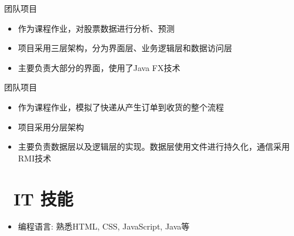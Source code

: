 \documentclass{resume}
\begin{document}
  {团队项目}
\begin{onehalfspacing}
\begin{itemize}
  \item 作为课程作业，对股票数据进行分析、预测
  \item 项目采用三层架构，分为界面层、业务逻辑层和数据访问层
  \item 主要负责大部分的界面，使用了Java FX技术
\end{itemize}
\end{onehalfspacing}

  {团队项目}
\begin{onehalfspacing}
\begin{itemize}
  \item 作为课程作业，模拟了快递从产生订单到收货的整个流程
  \item 项目采用分层架构
  \item 主要负责数据层以及逻辑层的实现。数据层使用文件进行持久化，通信采用RMI技术
\end{itemize}
\end{onehalfspacing}



\section{\faCogs\ IT 技能}
\begin{itemize}[parsep=0.5ex]
  \item 编程语言: 熟悉HTML, CSS, JavaScript, Java等
\end{itemize}

%
%
\end{document}
